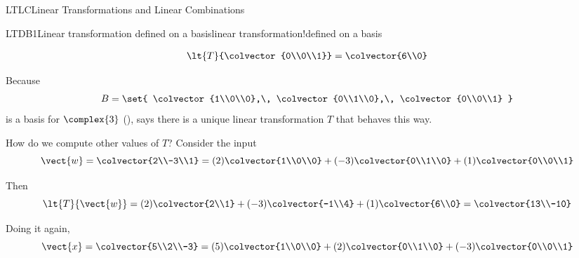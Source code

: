 \begin{subsect}{LTLC}{Linear Transformations and Linear Combinations}
\begin{example}{LTDB1}{Linear transformation defined on a basis}{linear transformation!defined on a basis}
\begin{para}
\begin{align*}
\lt{T}{\colvector{0\\0\\1}}=\colvector{6\\0}
\end{align*}
\end{para}
%
\begin{para}Because
%
\begin{equation*}
B=\set{
\colvector{1\\0\\0},\,
\colvector{0\\1\\0},\,
\colvector{0\\0\\1}
}
\end{equation*}
%
is a basis for $\complex{3}$ (),  says there is a unique linear transformation $T$ that behaves this way.\end{para}
%
\begin{para}How do we compute other values of $T$?  Consider the input
%
\begin{equation*}
\vect{w}=\colvector{2\\-3\\1}=(2)\colvector{1\\0\\0}+(-3)\colvector{0\\1\\0}+(1)\colvector{0\\0\\1}
\end{equation*}
\end{para}
%
\begin{para}Then
%
\begin{equation*}
\lt{T}{\vect{w}}=(2)\colvector{2\\1}+ (-3)\colvector{-1\\4}+ (1)\colvector{6\\0}=\colvector{13\\-10}
\end{equation*}
\end{para}
%
\begin{para}Doing it again,
%
\begin{equation*}
\vect{x}=\colvector{5\\2\\-3}=(5)\colvector{1\\0\\0}+(2)\colvector{0\\1\\0}+(-3)\colvector{0\\0\\1}

\end{equation*}
\end{para}
\end{example}
\end{subsect}
